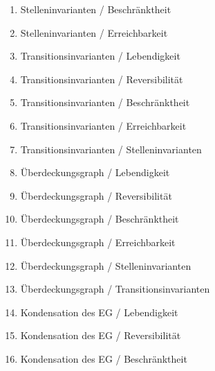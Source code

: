 \documentclass[10pt]{scrartcl}
\begin{document}
\begin{enumerate}
\item{Stelleninvarianten / Beschränktheit}\\

\item{Stelleninvarianten / Erreichbarkeit}\\

\item{Transitionsinvarianten / Lebendigkeit}\\

\item{Transitionsinvarianten / Reversibilität}\\

\item{Transitionsinvarianten / Beschränktheit}\\

\item{Transitionsinvarianten / Erreichbarkeit}\\

\item{Transitionsinvarianten / Stelleninvarianten}\\

\item{Überdeckungsgraph / Lebendigkeit}\\

\item{Überdeckungsgraph / Reversibilität}\\

\item{Überdeckungsgraph / Beschränktheit}\\

\item{Überdeckungsgraph / Erreichbarkeit}\\

\item{Überdeckungsgraph / Stelleninvarianten}\\

\item{Überdeckungsgraph / Transitionsinvarianten}\\

\item{Kondensation des EG / Lebendigkeit}\\

\item{Kondensation des EG  / Reversibilität}\\

\item{Kondensation des EG  / Beschränktheit}\\


\end{enumerate}
\end{document}
